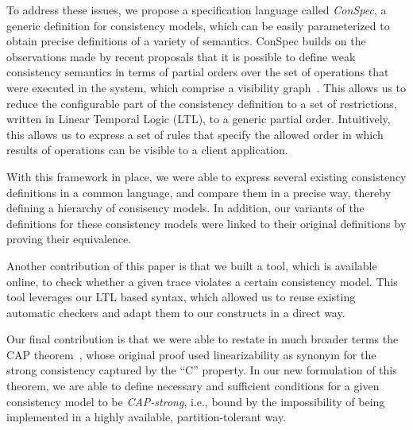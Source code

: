 \documentclass{sig-alternate-05-2015}
\begin{document}
To address these issues, we propose a specification language called
\emph{ConSpec}, a generic definition for consistency models, which can
be easily parameterized to obtain precise definitions of a variety of
semantics. ConSpec builds on the observations made by recent proposals
that it is possible to define weak consistency semantics in terms of
partial orders over the set of operations that were executed in the
system, which comprise a visibility graph~\cite{redblue, gotsman:popl, chengli:por}. This allows us to reduce
the configurable part of the consistency definition to a set of restrictions,
written in Linear Temporal Logic (LTL), to a generic partial order.
Intuitively, this allows us to express a set of rules that specify the allowed order in which results of operations can be visible to a client application. 


With this framework in place, we were able to express several existing
consistency definitions in a common language, and compare them in a precise
way, thereby defining a hierarchy of consisency models. In addition, our
variants of the definitions for these
consistency models were linked to their original definitions by proving their
equivalence.

Another contribution of this paper is that we built a tool, which is available online, to check whether a given trace violates a certain consistency model. This tool leverages our LTL based syntax, which allowed us to reuse existing automatic checkers and adapt them to our constructs in a direct way.

Our final contribution is that we were able to restate in much broader terms the CAP theorem~\cite{cap}, whose original proof used linearizability as synonym for the strong consistency captured by the ``C'' property. In our new formulation of this theorem, we are able to define necessary and sufficient conditions for a given consistency model to be \emph{CAP-strong}, i.e., bound by the impossibility of being implemented in a highly available, partition-tolerant way.
\end{document}
